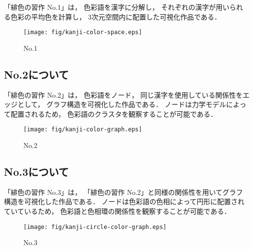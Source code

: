 \documentclass[a4j,twocolumn]{ujarticle} %
\newcommand{\workname}{緋色の習作}
\newcommand{\colorname}{色彩語}
\begin{document}
「\workname{} No.1」は，
\colorname{}を漢字に分解し，
それぞれの漢字が用いられる色彩の平均色を計算し，
3次元空間内に配置した可視化作品である．

\begin{figure}[htbp]
  \begin{center}
    \texttt{[image: fig/kanji-color-space.eps]}
    \caption{No.1}
    \label{no1}
  \end{center}
\end{figure}

\subsection{No.2について}

「\workname{} No.2」は，
\colorname{}をノード，
同じ漢字を使用している関係性をエッジとして，
グラフ構造を可視化した作品である．
ノードは力学モデルによって配置されるため，
\colorname{}のクラスタを観察することが可能である．

\begin{figure}[htbp]
  \begin{center}
    \texttt{[image: fig/kanji-color-graph.eps]}
    \caption{No.2}
    \label{no2}
  \end{center}
\end{figure}

\subsection{No.3について}

「\workname{} No.3」は，
「\workname{} No.2」と同様の関係性を用いてグラフ構造を可視化した作品である．
ノードは\colorname{}の色相によって円形に配置されていているため，
\colorname{}と色相環の関係性を観察することが可能である．

\begin{figure}[htbp]
  \begin{center}
    \texttt{[image: fig/kanji-circle-color-graph.eps]}
    \caption{No.3}
    \label{no3}
  \end{center}
\end{figure}
\end{document}
